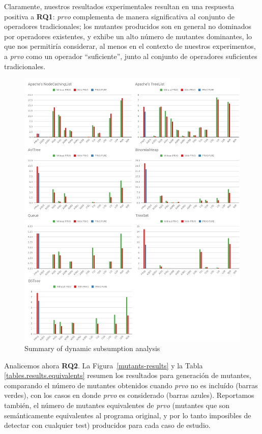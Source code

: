 Claramente, nuestros resultados experimentales resultan en una respuesta positiva a \textbf{RQ1}: \emph{prvo} complementa de manera significativa al conjunto de operadores tradicionales; los mutantes producidos son en general no dominados por operadores existentes, y exhibe un alto n\'umero de mutantes dominantes, lo que nos permitir\'ia considerar, al menos en el contexto de nuestros experimentos, a \emph{prvo} como un operador ``suficiente'', junto al conjunto de operadores suficientes tradicionales.

\begin{figure}[t]
	\begin{center}
		\includegraphics[width=12cm]{figures/Tables.png}
	\end{center}
	\caption{Summary of dynamic subsumption analysis}
	\label{subsumption-results}
\end{figure}

Analicemos ahora \textbf{RQ2}. La Figura~\ref{mutants-results} y la Tabla \ref{tables.results.equivalents} resumen los resultados para generaci\'on de mutantes, comparando el n\'umero de mutantes obtenidos cuando \emph{prvo} no es inclu\'ido (barras verdes), con los casos en donde \emph{prvo} es considerado (barras azules). Reportamos tambi\'en, el n\'umero de mutantes equivalentes de \emph{prvo} (mutantes que son sem\'anticamente equivalentes al programa original, y por lo tanto imposibles de detectar con cualquier test) producidos para cada caso de estudio.

